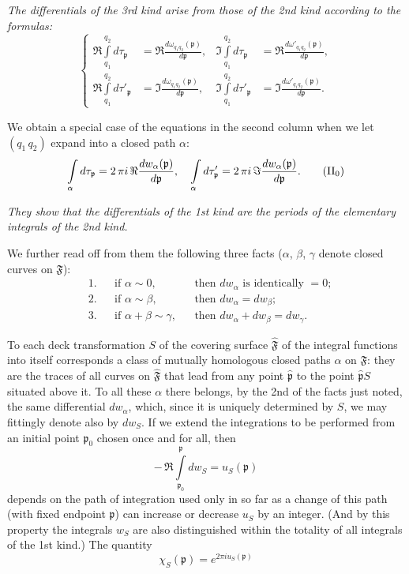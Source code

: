 \documentclass{article}
\begin{document}
\emph{The differentials of the 3rd kind arise from those of the 2nd kind according to the formulas:}
\[ \left\{ \begin{aligned}
\Re \int\limits_{q_1}^{q_2} d\tau_\mathfrak{p} &= \Re \frac{d\omega_{q_1 q_2}(\mathfrak{p})}{d\mathfrak{p}}, & \Im \int\limits_{q_1}^{q_2} d\tau_\mathfrak{p} &= \Re \frac{d\omega'_{q_1 q_2}(\mathfrak{p})}{d\mathfrak{p}}, \\
\Re \int\limits_{q_1}^{q_2} d\tau'_\mathfrak{p} &= \Im \frac{d\omega_{q_1 q_2}(\mathfrak{p})}{d\mathfrak{p}}, & \Im \int\limits_{q_1}^{q_2} d\tau'_\mathfrak{p} &= \Im \frac{d\omega'_{q_1 q_2}(\mathfrak{p})}{d\mathfrak{p}}.
\end{aligned} \right. \tag{II} \]

We obtain a special case of the equations in the second column when we let $(q_1\,q_2)$ expand into a closed path $\alpha$:
\[ \int\limits_\alpha d\tau_\mathfrak{p} = 2\,\pi i\,\Re \frac{dw_\alpha(\mathfrak{p})}{d\mathfrak{p}}, \quad \int\limits_\alpha d\tau'_\mathfrak{p} = 2\,\pi i\,\Im \frac{dw_\alpha(\mathfrak{p})}{d\mathfrak{p}}. \tag{$\mathrm{II}_0$} \]

\emph{They show that the differentials of the 1st kind are the periods of the elementary integrals of the 2nd kind.}

We further read off from them the following three facts ($\alpha$, $\beta$, $\gamma$ denote closed curves on $\mathfrak{F}$):
\[ \begin{aligned}
&1. & &\text{if } \alpha \sim 0, & &\text{then } dw_\alpha \text{ is identically } = 0; \\
&2. & &\text{if } \alpha \sim \beta, & &\text{then } dw_\alpha = dw_\beta; \\
&3. & &\text{if } \alpha + \beta \sim \gamma, & &\text{then } dw_\alpha + dw_\beta = dw_\gamma.
\end{aligned} \]

To each deck transformation $S$ of the covering surface $\hat{\mathfrak{F}}$ of the integral functions into itself corresponds a class of mutually homologous closed paths $\alpha$ on $\mathfrak{F}$: they are the traces of all curves on $\hat{\mathfrak{F}}$ that lead from any point $\hat{\mathfrak{p}}$ to the point $\hat{\mathfrak{p}}S$ situated above it. To all these $\alpha$ there belongs, by the 2nd of the facts just noted, the same differential $dw_\alpha$, which, since it is uniquely determined by $S$, we may fittingly denote also by $dw_S$. If we extend the integrations to be performed from an initial point $\mathfrak{p}_0$ chosen once and for all, then
\[ -\,\Re \int\limits_{\mathfrak{p}_0}^\mathfrak{p} dw_S = u_S(\mathfrak{p}) \]
depends on the path of integration used only in so far as a change of this path (with fixed endpoint $\mathfrak{p}$) can increase or decrease $u_S$ by an integer. (And by this property the integrals $w_S$ are also distinguished within the totality of all integrals of the 1st kind.) The quantity
\[ \chi_S(\mathfrak{p}) = e^{2\pi i u_S(\mathfrak{p})} \]
\end{document}
